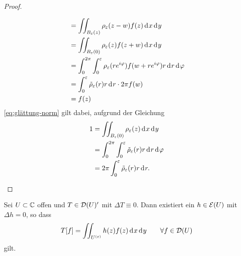 \begin{proof}
\begin{enumerate}
\begin{align}
      & = \iint_{B_\epsilon(z)} \rho_\epsilon(z -w ) f(z) \d[x]\d[y]
      \nonumber \\
      & = \iint_{B_\epsilon(0)} \rho_\epsilon(z) f(z + w) \d[x]\d[y]
      \nonumber \\
      & = \int_0^{2\pi} \int_0^\epsilon \rho_\epsilon(re^{i\phi}) f(w +
       re^{i\phi}) r \d[r] \d[\phi] \nonumber \\
      & = \int_0^\epsilon \tilde \rho_\epsilon(r) r\d[r] \cdot 2 \pi
      f(w) \nonumber \\
      & = f(z) \label{eq:glättung-norm} 
    \end{align}
    \eqref{eq:glättung-norm} gilt dabei, aufgrund der Gleichung
    \begin{align*}
      1 & = \iint_{B_\epsilon(0)}\rho_\epsilon(z) \d[x]\d[y] \\
      & = \int_0^{2\pi}\int_0^{\epsilon} \tilde \rho_\epsilon(r) r
      \d[r] \d[\phi] \\
      & = 2 \pi \int_0^\epsilon \tilde \rho_\epsilon(r) r \d[r].
    \end{align*}
  \end{enumerate}
\end{proof}

\begin{thm}
  \label{thm:weyl}
  Sei $U \subset \mathbb{C}$ offen und $T \in \mathcal{D}(U)'$ mit $\Delta T \equiv
  0$. 
  Dann existiert ein $h \in \mathcal{E}(U)$ mit $\Delta h = 0$, so dass
  \[T[f] = \iint_{U^{(\epsilon)}} h(z) f(z) \d[x]\d[y] \qquad \forall f \in \dist(U)
  \]
  gilt.
\end{thm}

